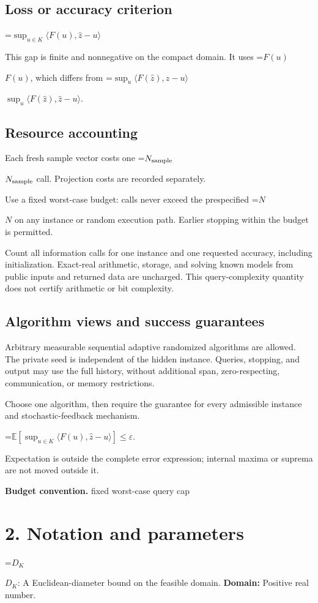 \documentclass[10pt,a4paper]{article}
\newcommand{\AtlasMath}[1]{\par\begingroup\centering\setbox0=\hbox{$\displaystyle #1$}\ifdim\wd0>1.4\linewidth\typeout{ATLAS WIDE FORMULA: \the\wd0}\fi\ifdim\wd0>\linewidth\resizebox{\linewidth}{!}{\box0}\else\box0\fi\par\endgroup}
\newcommand{\AtlasInlineMath}[1]{\begingroup\setbox0=\hbox{$#1$}\ifdim\wd0>.4\linewidth\endgroup\AtlasMath{#1}\else\endgroup$#1$\fi}
\begin{document}
\subsection{Loss or accuracy criterion}

\AtlasMath{\sup_{u\in K}\langle F(u),\widehat{z}-u\rangle}


This gap is finite and nonnegative on the compact domain. It uses \AtlasInlineMath{F(u)}, which differs from \AtlasInlineMath{\sup_u\langle F(\widehat{z}),\widehat{z}-u\rangle}.

\subsection{Resource accounting}
Each fresh sample vector costs one \AtlasInlineMath{N_{\rm sample}} call. Projection costs are recorded separately.

Use a fixed worst-case budget: calls never exceed the prespecified \AtlasInlineMath{N} on any instance or random execution path. Earlier stopping within the budget is permitted.

Count all information calls for one instance and one requested accuracy, including initialization. Exact-real arithmetic, storage, and solving known models from public inputs and returned data are uncharged. This query-complexity quantity does not certify arithmetic or bit complexity.

\subsection{Algorithm views and success guarantees}
Arbitrary measurable sequential adaptive randomized algorithms are allowed. The private seed is independent of the hidden instance. Queries, stopping, and output may use the full history, without additional span, zero-respecting, communication, or memory restrictions.

Choose one algorithm, then require the guarantee for every admissible instance and stochastic-feedback mechanism.


\AtlasMath{\mathbb{E}\!\left[\sup_{u\in K}\langle F(u),\widehat{z}-u\rangle\right]\le\varepsilon.}


Expectation is outside the complete error expression; internal maxima or suprema are not moved outside it.

\textbf{Budget convention.} fixed worst-case query cap

\section{2. Notation and parameters}
\AtlasInlineMath{D_K}: A Euclidean-diameter bound on the feasible domain. \textbf{Domain:} Positive real number.
\end{document}
